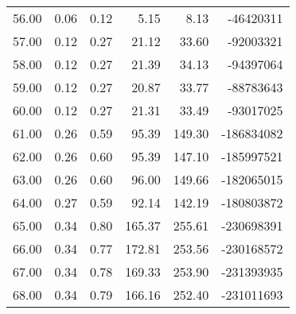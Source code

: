 \begin{table}[ht]
\begin{tabular}{rrrrrr}
  56.00 & 0.06 & 0.12 & 5.15 & 8.13 & -46420311 \\ 
  57.00 & 0.12 & 0.27 & 21.12 & 33.60 & -92003321 \\ 
  58.00 & 0.12 & 0.27 & 21.39 & 34.13 & -94397064 \\ 
  59.00 & 0.12 & 0.27 & 20.87 & 33.77 & -88783643 \\ 
  60.00 & 0.12 & 0.27 & 21.31 & 33.49 & -93017025 \\ 
  61.00 & 0.26 & 0.59 & 95.39 & 149.30 & -186834082 \\ 
  62.00 & 0.26 & 0.60 & 95.39 & 147.10 & -185997521 \\ 
  63.00 & 0.26 & 0.60 & 96.00 & 149.66 & -182065015 \\ 
  64.00 & 0.27 & 0.59 & 92.14 & 142.19 & -180803872 \\ 
  65.00 & 0.34 & 0.80 & 165.37 & 255.61 & -230698391 \\ 
  66.00 & 0.34 & 0.77 & 172.81 & 253.56 & -230168572 \\ 
  67.00 & 0.34 & 0.78 & 169.33 & 253.90 & -231393935 \\ 
  68.00 & 0.34 & 0.79 & 166.16 & 252.40 & -231011693 \\ 
   \hline
\end{tabular}
\end{table}
